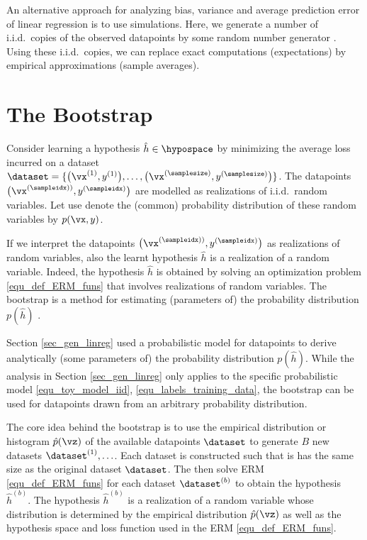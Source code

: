 \documentclass[12pt]{report}
\begin{document}
An alternative approach for analyzing bias, variance and average 
prediction error of linear regression is to use simulations. Here, we 
generate a number of i.i.d.\ copies of the observed datapoints by 
some random number generator \cite{Andrieu2001}. Using these 
i.i.d.\ copies, we can replace exact computations (expectations) 
by empirical approximations (sample averages).  

\section{The Bootstrap} 

Consider learning a hypothesis $\hat{h} \in \hypospace$ by minimizing the 
average loss incurred on a dataset $\dataset=\{ \big(\vx^{(1)},y^{(1)}\big),\ldots,\big(\vx^{(\samplesize)},y^{(\samplesize)}\big)\}$. 
The datapoints $\big(\vx^{(\sampleidx))},y^{(\sampleidx)}\big)$ are modelled 
as realizations of i.i.d.\ random variables. Let use denote the (common) probability 
distribution of these random variables by $p(\vx,y)$. 

If we interpret the datapoints $\big(\vx^{(\sampleidx))},y^{(\sampleidx)}\big)$ as realizations of 
random variables, also the learnt hypothesis $\hat{h}$ is a realization  
of a random variable. Indeed, the hypothesis $\hat{h}$ is obtained by 
solving an optimization problem \eqref{equ_def_ERM_funs} that involves 
realizations of random variables. The bootstrap is a method for estimating 
(parameters of) the probability distribution $p(\hat{h})$ \cite{hastie01statisticallearning}.  

Section \ref{sec_gen_linreg} used a probabilistic model for 
datapoints to derive analytically (some parameters of) the probability 
distribution $p(\hat{h})$. While the analysis in Section \ref{sec_gen_linreg} 
only applies to the specific probabilistic model \eqref{equ_toy_model_iid}, \eqref{equ_labels_training_data}, 
the bootstrap can be used for datapoints drawn from an arbitrary 
probability distribution. 

The core idea behind the bootstrap is to use the empirical distribution 
or histogram $\hat{p}(\vz)$ of the available datapoints $\dataset$ to 
generate $B$ new datasets $\dataset^{(1)},\ldots$. Each dataset is 
constructed such that is has the same size as the original dataset $\dataset$. 
The then solve ERM \eqref{equ_def_ERM_funs} for each dataset $\dataset^{(b)}$ to obtain 
the hypothesis $\hat{h}^{(b)}$. The hypothesis $\hat{h}^{(b)}$ is a realization 
of a random variable whose distribution is determined by the empirical distribution 
$\hat{p}(\vz)$ as well as the hypothesis space and loss function used in the ERM \eqref{equ_def_ERM_funs}. 
\end{document}
